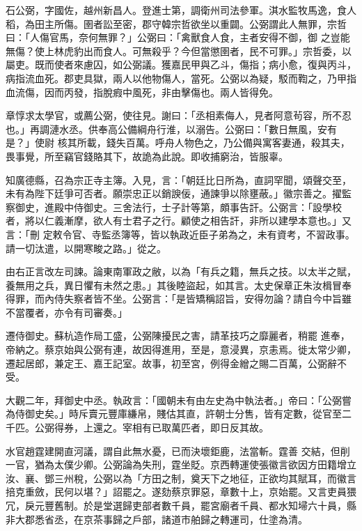 \begin{pinyinscope}
 石公弼，字國佐，越州新昌人。登進士第，調衛州司法參軍。淇水監牧馬逸，食人稻，為田主所傷。圉者訟至密，郡守韓宗哲欲坐以重闢。公弼謂此人無罪，宗哲曰：「人傷官馬，奈何無罪？」公弼曰：「禽獸食人食，主者安得不御，御
 之豈能無傷？使上林虎豹出而食人。可無殺乎？今但當懲圉者，民不可罪。」宗哲委，以屬吏。既而使者來慮囚，如公弼議。獲嘉民甲與乙斗，傷指；病小愈，復與丙斗，病指流血死。郡吏具獄，兩人以他物傷人，當死。公弼以為疑，駁而鞫之，乃甲指血流傷，因而丙發，指脫瘕中風死，非由擊傷也。兩人皆得免。



 章惇求太學官，或薦公弼，使往見。謝曰：「丞相素侮人，見者阿意茍容，所不忍也。」再調漣水丞。供奉高公備綱舟行淮，以溺告。公弼曰：「數日無風，安有是？」使尉
 核其所載，錢失百萬。呼舟人物色之，乃公備與寓客妻通，殺其夫，畏事覺，所至竊官錢賂其下，故詭為此說。即收捕窮治，皆服辜。



 知廣德縣，召為宗正寺主簿。入見，言：「朝廷比日所為，直詞罕聞，頌聲交至，未有為陛下廷爭可否者。願崇忠正以銷諛佞，通諫爭以除壅蔽。」徽宗善之。擢監察御史，進殿中侍御史。三舍法行，士子計等第，頗事告訐。公弼言：「設學校者，將以仁義漸摩，欲人有士君子之行。顧使之相告訐，非所以建學本意也。」又言：「刪
 定敕令官、寺監丞簿等，皆以執政近臣子弟為之，未有資考，不習政事。請一切汰遣，以開寒畯之路。」從之。



 由右正言改左司諫。論東南軍政之敝，以為「有兵之籍，無兵之技。以太半之賦，養無用之兵，異日懼有未然之患。」其後睦盜起，如其言。太史保章正朱汝楫冒奉得罪，而內侍失察者皆不坐。公弼言：「是皆矯稱詔旨，安得勿論？請自今中旨雖不當覆者，亦令有司審奏。」



 遷侍御史。蘇杭造作局工盛，公弼陳擾民之害，請革技巧之靡麗者，稍罷
 進奉，帝納之。蔡京始與公弼有連，故因得進用，至是，意浸異，京恚焉。徙太常少卿，遷起居郎，兼定王、嘉王記室。故事，初至宮，例得金繒之賜二百萬，公弼辭不受。



 大觀二年，拜御史中丞。執政言：「國朝未有由左史為中執法者。」帝曰：「公弼嘗為侍御史矣。」時斥賣元豐庫縑帛，賤估其直，許朝士分售，皆有定數，從官至二千匹。公弼得券，上還之。宰相有已取萬匹者，即日反其故。



 水官趙霆建開直河議，謂自此無水憂，已而決壞鉅鹿，法當斬。霆善
 交結，但削一官，猶為太僕少卿。公弼論為失刑，霆坐貶。京西轉運使張徽言欲因方田籍增立汝、襄、鄧三州稅，公弼以為「方田之制，奠天下之地征，正欲均其賦耳，而徽言掊克重斂，民何以堪？」詔罷之。遂劾蔡京罪惡，章數十上，京始罷。又言吏員猥冗，戾元豐舊制。於是堂選歸吏部者數千員，罷宮廟者千員、都水知埽六十員，縣非大郡悉省丞，在京茶事歸之戶部，諸道市舶歸之轉運司，仕塗為清。




\end{pinyinscope}
